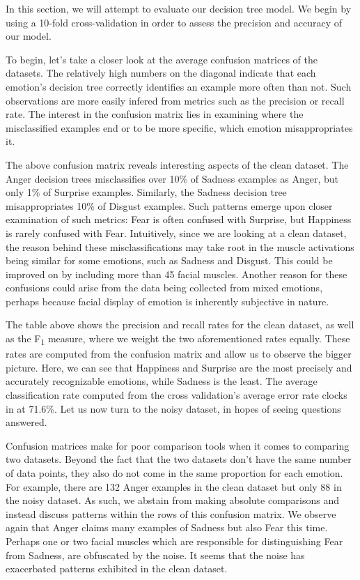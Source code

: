 In this section, we will attempt to evaluate our decision tree model. We begin by using a 10-fold cross-validation
in order to assess the precision and accuracy of our model. 

To begin, let's take a closer look at the average confusion matrices of the datasets.
The relatively high numbers on the diagonal indicate that each emotion's decision tree correctly
identifies an example more often than not. Such observations are more easily infered from metrics such as the precision or recall rate.
The interest in the confusion matrix lies in examining where the misclassified examples end or to be more specific,
which emotion misappropriates it. 



The above confusion matrix reveals interesting aspects of the clean dataset.
The Anger decision trees misclassifies over 10\% of Sadness examples as Anger, but only 1\% of Surprise examples.
Similarly, the Sadness decision tree misappropriates 10\% of Disgust examples.
Such patterns emerge upon closer examination of such metrics: Fear is often confused with Surprise, but Happiness is rarely confused with Fear.
Intuitively, since we are looking at a clean dataset,
the reason behind these misclassifications may take root in the muscle activations being similar for some emotions, such as Sadness and Disgust.
This could be improved on by including  more than 45 facial muscles.
Another reason for these confusions could arise from the data being collected from mixed emotions, perhaps because facial display
of emotion is inherently subjective in nature.



The table above shows the precision and recall rates for the clean dataset, as well as the F\textsubscript{1} measure,
where we weight the two aforementioned rates equally. These rates are computed from the confusion matrix and allow us to
observe the bigger picture. Here, we can see that Happiness and Surprise are the most precisely and accurately recognizable
emotions, while Sadness is the least. The average classification rate computed from the cross validation's average error rate
clocks in at 71.6\%. Let us now turn to the noisy dataset, in hopes of seeing questions answered.

 


Confusion matrices make for poor comparison tools when it comes to comparing two datasets.
Beyond the fact that the two datasets don't have the same number of data points,
they also do not come in the same proportion for each emotion. For example, there are 132 Anger examples in the clean dataset but only
88 in the noisy dataset. As such, we abstain from making absolute comparisons and instead discuss patterns within the rows
of this confusion matrix. We observe again that Anger claims many examples of Sadness but also Fear this time. Perhaps one or two facial
muscles which are responsible for distinguishing Fear from Sadness, are obfuscated by the noise.
It seems that the noise has exacerbated patterns exhibited in the clean dataset.

